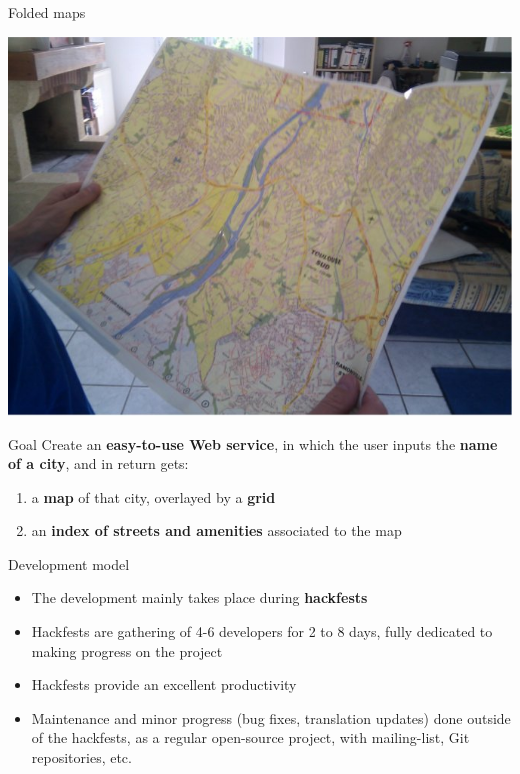 \documentclass{beamer}
\begin{document}
\begin{frame}{Folded maps}
  \begin{center}
    \includegraphics[height=0.8\textheight]{folded-map.jpg}
  \end{center}
\end{frame}

\begin{frame}{Goal}
  \Large
  Create an {\bf easy-to-use Web service}, in which the user inputs
  the {\bf name of a city}, and in return gets:
  \begin{enumerate}
  \item a {\bf map} of that city, overlayed by a {\bf grid}
  \item an {\bf index of streets and amenities} associated to the map
  \end{enumerate}
\end{frame}

\begin{frame}{Development model}
  \begin{itemize}
  \item The development mainly takes place during {\bf hackfests}
  \item Hackfests are gathering of 4-6 developers for 2 to 8 days,
    fully dedicated to making progress on the project
  \item Hackfests provide an excellent productivity
  \item Maintenance and minor progress (bug fixes, translation
    updates) done outside of the hackfests, as a regular open-source
    project, with mailing-list, Git repositories, etc.
  \end{itemize}
\end{frame}
\end{document}
